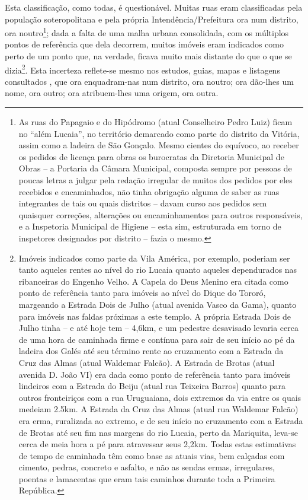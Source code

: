 Esta classificação, como todas, é questionável. Muitas ruas eram classificadas pela população soteropolitana e pela própria Intendência/Prefeitura ora num distrito, ora noutro\footnote{As ruas do Papagaio e do Hipódromo (atual Conselheiro Pedro Luiz) ficam no ``além Lucaia'', no território demarcado como parte do distrito da Vitória, assim como a ladeira de São Gonçalo. Mesmo cientes do equívoco, ao receber os pedidos de licença para obras os burocratas da Diretoria Municipal de Obras -- a Portaria da Câmara Municipal, composta sempre por pessoas de poucas letras a julgar pela redação irregular de muitos dos pedidos por eles recebidos e encaminhados, não tinha obrigação alguma de saber as ruas integrantes de tais ou quais distritos -- davam curso aos pedidos sem quaisquer correções, alterações ou encaminhamentos para outros responsáveis, e a Inspetoria Municipal de Higiene -- esta sim, estruturada em torno de inspetores designados por distrito -- fazia o mesmo.}; dada a falta de uma malha urbana consolidada, com os múltiplos pontos de referência que dela decorrem, muitos imóveis eram indicados como perto de um ponto que, na verdade, ficava muito mais distante do que o que se dizia\footnote{Imóveis indicados como parte da Vila América, por exemplo, poderiam ser tanto aqueles rentes ao nível do rio Lucaia quanto aqueles dependurados nas ribanceiras do Engenho Velho. A Capela do Deus Menino era citada como ponto de referência tanto para imóveis ao nível do Dique do Tororó, margeando a Estrada Dois de Julho (atual avenida Vasco da Gama), quanto para imóveis nas faldas próximas a este templo. A própria Estrada Dois de Julho tinha -- e até hoje tem -- 4,6km, e um pedestre desavisado levaria cerca de uma hora de caminhada firme e contínua para sair de seu início ao pé da ladeira dos Galés até seu término rente ao cruzamento com a Estrada da Cruz das Almas (atual Waldemar Falcão). A Estrada de Brotas (atual avenida D. João VI) era dada como ponto de referência tanto para imóveis lindeiros com a Estrada do Beiju (atual rua Teixeira Barros) quanto para outros fronteiriços com a rua Uruguaiana, dois extremos da via entre os quais medeiam 2.5km. A Estrada da Cruz das Almas (atual rua Waldemar Falcão) era erma, ruralizada ao extremo, e de seu início no cruzamento com a Estrada de Brotas até seu fim nas margens do rio Lucaia, perto da Mariquita, leva-se cerca de meia hora a pé para atravessar seus 2,2km. Todas estas estimativas de tempo de caminhada têm como base as atuais vias, bem calçadas com cimento, pedras, concreto e asfalto, e não as sendas ermas, irregulares, poentas e lamacentas que eram tais caminhos durante toda a Primeira República.}. Esta incerteza reflete-se mesmo nos estudos, guias, mapas e listagens consultados \cite{dorea_ruas_1999, moraes_ruas_1959, municipal_atlas_1955, salvador_mapa_1969, santos_aguas_2010, souza_guia_1935, valladares_beaba_2012, VASCONCELOS2002, weyll_mappa_1851}, que ora enquadram-nas num distrito, ora noutro; ora dão-lhes um nome, ora outro; ora atribuem-lhes uma origem, ora outra.

